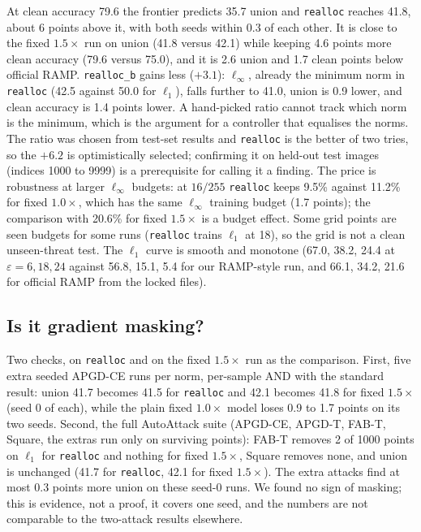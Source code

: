 \documentclass[11pt]{article}
\begin{document}
At clean accuracy 79.6 the frontier predicts 35.7 union and \texttt{realloc} reaches 41.8, about 6 points above it, with both seeds within 0.3 of each other.
It is close to the fixed $1.5\times$ run on union (41.8 versus 42.1) while keeping 4.6 points more clean accuracy (79.6 versus 75.0), and it is 2.6 union and 1.7 clean points below official RAMP.
\texttt{realloc\_b} gains less ($+3.1$): $\ell_\infty$, already the minimum norm in \texttt{realloc} (42.5 against 50.0 for $\ell_1$), falls further to 41.0, union is 0.9 lower, and clean accuracy is 1.4 points lower. A hand-picked ratio cannot track which norm is the minimum, which is the argument for a controller that equalises the norms.
The ratio was chosen from test-set results and \texttt{realloc} is the better of two tries, so the $+6.2$ is optimistically selected; confirming it on held-out test images (indices 1000 to 9999) is a prerequisite for calling it a finding.
The price is robustness at larger $\ell_\infty$ budgets: at $16/255$ \texttt{realloc} keeps 9.5\% against 11.2\% for fixed $1.0\times$, which has the same $\ell_\infty$ training budget (1.7 points); the comparison with 20.6\% for fixed $1.5\times$ is a budget effect. Some grid points are seen budgets for some runs (\texttt{realloc} trains $\ell_1$ at 18), so the grid is not a clean unseen-threat test. The $\ell_1$ curve is smooth and monotone (67.0, 38.2, 24.4 at $\varepsilon=6,18,24$ against 56.8, 15.1, 5.4 for our RAMP-style run, and 66.1, 34.2, 21.6 for official RAMP from the locked files).

\subsection{Is it gradient masking?}\label{sec:masking}
Two checks, on \texttt{realloc} and on the fixed $1.5\times$ run as the comparison. First, five extra seeded APGD-CE runs per norm, per-sample AND with the standard result:
union 41.7 becomes 41.5 for \texttt{realloc} and 42.1 becomes 41.8 for fixed $1.5\times$ (seed 0 of each), while the plain fixed $1.0\times$ model loses 0.9 to 1.7 points on its two seeds.
Second, the full AutoAttack suite (APGD-CE, APGD-T, FAB-T, Square, the extras run only on surviving points): FAB-T removes 2 of 1000 points on $\ell_1$ for \texttt{realloc} and nothing for fixed $1.5\times$, Square removes none, and union is unchanged
(41.7 for \texttt{realloc}, 42.1 for fixed $1.5\times$). The extra attacks find at most 0.3 points more union on these seed-0 runs. We found no sign of masking; this is evidence, not a proof, it covers one seed, and the numbers are not comparable to the two-attack results elsewhere.
\end{document}
